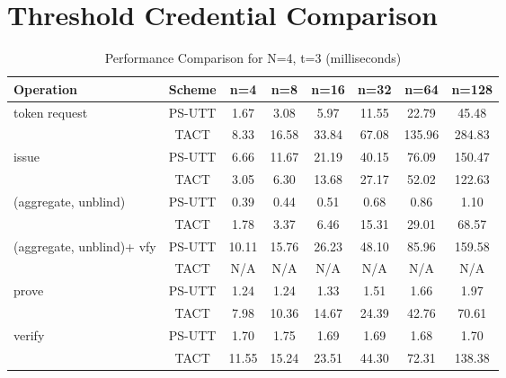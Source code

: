 \section{Threshold Credential Comparison}

\begin{table}[htbp]
\centering
\caption{Performance Comparison for N=4, t=3 (milliseconds)}
\begin{tabular}{lccccccc}
\toprule
\textbf{Operation} & \textbf{Scheme} & \textbf{n=4} & \textbf{n=8} & \textbf{n=16} & \textbf{n=32} & \textbf{n=64} & \textbf{n=128} \\
\midrule
token request & PS-UTT & 1.67 & 3.08 & 5.97 & 11.55 & 22.79 & 45.48 \\
 & TACT & 8.33 & 16.58 & 33.84 & 67.08 & 135.96 & 284.83 \\
\midrule
issue & PS-UTT & 6.66 & 11.67 & 21.19 & 40.15 & 76.09 & 150.47 \\
 & TACT & 3.05 & 6.30 & 13.68 & 27.17 & 52.02 & 122.63 \\
\midrule
(aggregate, unblind) & PS-UTT & 0.39 & 0.44 & 0.51 & 0.68 & 0.86 & 1.10 \\
 & TACT & 1.78 & 3.37 & 6.46 & 15.31 & 29.01 & 68.57 \\
\midrule
(aggregate, unblind)+ vfy & PS-UTT & 10.11 & 15.76 & 26.23 & 48.10 & 85.96 & 159.58 \\
 & TACT & N/A & N/A & N/A & N/A & N/A & N/A \\
\midrule
prove & PS-UTT & 1.24 & 1.24 & 1.33 & 1.51 & 1.66 & 1.97 \\
 & TACT & 7.98 & 10.36 & 14.67 & 24.39 & 42.76 & 70.61 \\
\midrule
verify & PS-UTT & 1.70 & 1.75 & 1.69 & 1.69 & 1.68 & 1.70 \\
 & TACT & 11.55 & 15.24 & 23.51 & 44.30 & 72.31 & 138.38 \\
\bottomrule
\end{tabular}
\label{tab:perf-comp-4-3}
\end{table}


